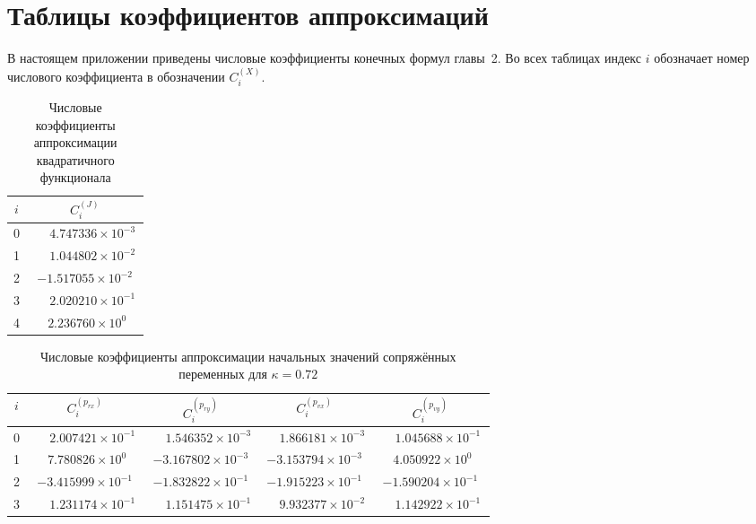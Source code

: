 \chapter{Таблицы коэффициентов аппроксимаций}
\label{app:coefficients}
В настоящем приложении приведены числовые коэффициенты конечных формул главы~2. Во всех таблицах индекс $i$ обозначает номер числового коэффициента в обозначении $C_i^{(X)}$.

\begin{table}[htbp]
	\centering
	\caption{Числовые коэффициенты аппроксимации квадратичного функционала}
	\label{tab:appendixB_CJ}
	\begin{tabular}{|c|c|}
		\hline
		$i$ & $C_i^{(J)}$ \\
		\hline
		0 & $\phantom{-}4.747336\times10^{-3}$ \\
		1 & $\phantom{-}1.044802\times10^{-2}$ \\
		2 & $-1.517055\times10^{-2}$ \\
		3 & $\phantom{-}2.020210\times10^{-1}$ \\
		4 & $\phantom{-}2.236760\times10^{0\phantom{-}}$ \\
		\hline
	\end{tabular}
\end{table}

\begin{table}[htbp]
	\centering
	\caption{Числовые коэффициенты аппроксимации начальных значений сопряжённых переменных для $\kappa = 0.72$}
	\label{tab:appendixB_C_k072}
	\begin{tabular}{|c|c|c|c|c|}
		\hline
		$i$ & $C_i^{(p_{rx})}$ & $C_i^{(p_{ry})}$ & $C_i^{(p_{vx})}$ & $C_i^{(p_{vy})}$ \\
		\hline
		0 & $\phantom{-}2.007421\times10^{-1}$ & $\phantom{-}1.546352\times10^{-3}$ & $\phantom{-}1.866181\times10^{-3}$ & $\phantom{-}1.045688\times10^{-1}$ \\
		1 & $\phantom{-}7.780826\times10^{0\phantom{-}}$ & $-3.167802\times10^{-3}$ & $-3.153794\times10^{-3}$ & $\phantom{-}4.050922\times10^{0\phantom{-}}$ \\
		2 & $-3.415999\times10^{-1}$ & $-1.832822\times10^{-1}$ & $-1.915223\times10^{-1}$ & $-1.590204\times10^{-1}$ \\
		3 & $\phantom{-}1.231174\times10^{-1}$ & $\phantom{-}1.151475\times10^{-1}$ & $\phantom{-}9.932377\times10^{-2}$ & $\phantom{-}1.142922\times10^{-1}$ \\
		\hline
	\end{tabular}
\end{table}

